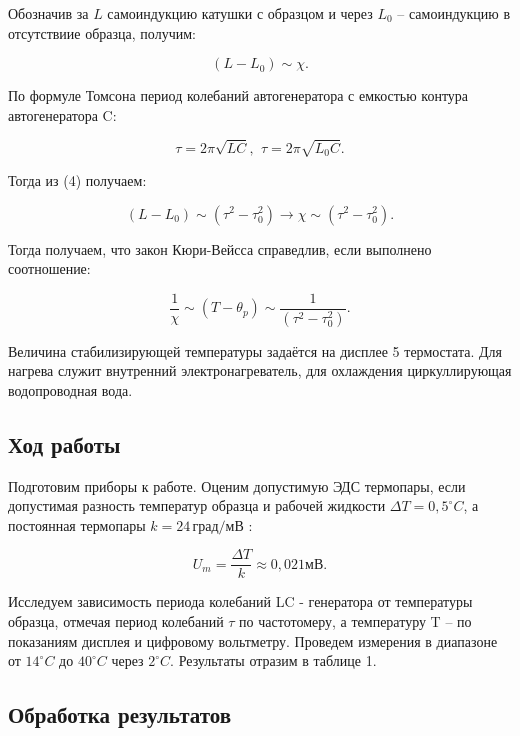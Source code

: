 Обозначив за $L$ самоиндукцию катушки с образцом и через $L_0$ -- самоиндукцию в отсутствиие образца, получим:

\begin{equation}
    (L-L_0) \sim \chi.    
\end{equation}

По формуле Томсона период колебаний автогенератора с емкостью контура автогенератора C:

\begin{equation}
    \tau = 2 \pi \sqrt{LC}, \,\
    \tau = 2 \pi \sqrt{L_0C}.
\end{equation}

Тогда из (4) получаем:

\begin{equation}
    (L - L_0) \sim (\tau^2 - \tau_0^2) \longrightarrow \chi \sim (\tau^2 - \tau_0^2).
\end{equation}

Тогда получаем, что закон Кюри-Вейсса справедлив, если выполнено соотношение:

\begin{equation}
    \frac{1}{\chi} \sim (T - \theta_p) \sim \frac{1}{(\tau^2 - \tau_0^2)}.
\end{equation}

Величина стабилизирующей температуры задаётся на дисплее 5 термостата. Для нагрева служит внутренний электронагреватель, для охлаждения циркуллирующая водопроводная вода. 

\subsection*{Ход работы}

Подготовим приборы к работе. Оценим допустимую ЭДС термопары, если допустимая разность температур образца и рабочей жидкости $\Delta T = 0,5 ^\circ C$, а постоянная термопары $k = 24 \, град/мВ$ :

\begin{equation}
    U_m = \frac{\Delta T}{k} \approx 0,021мВ.
\end{equation}

Исследуем зависимость периода колебаний LC - генератора от температуры образца, отмечая период колебаний $\tau$ по частотомеру, а температуру T -- по показаниям дисплея и цифровому вольтметру. Проведем измерения в диапазоне от $14 ^\circ C$ до $40 ^\circ C$ через $2 ^\circ C$. Результаты отразим в таблице 1.

\subsection*{Обработка результатов}


